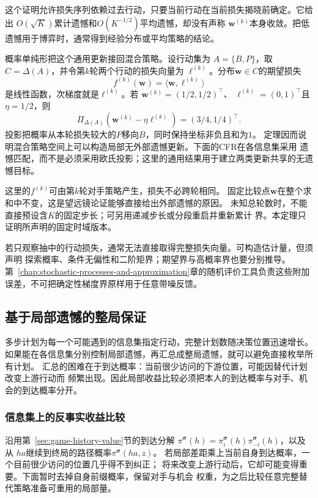 这个证明允许损失序列依赖过去行动，只要当前行动在当前损失揭晓前确定。它给出
\(O(\sqrt{K})\)累计遗憾和\(O(K^{-1/2})\)平均遗憾，却没有声称
\(\bm{w}^{(k)}\)本身收敛。把低遗憾用于博弈时，通常得到经验分布或平均策略的结论。

概率单纯形把这个通用更新接回混合策略。设行动集为
\(A=\{B,P\}\)，取\(C=\Delta(A)\)，并令第\(k\)轮两个行动的损失向量为
\(\bm{\ell}^{(k)}\)。分布\(\bm{w}\in C\)的期望损失
\[
  f^{(k)}(\bm{w})
  =
  \langle\bm{w},\bm{\ell}^{(k)}\rangle
\]
是线性函数，次梯度就是\(\bm{\ell}^{(k)}\)。若
\(\bm{w}^{(k)}=(1/2,1/2)^{\top}\)、
\(\bm{\ell}^{(k)}=(0,1)^{\top}\)且\(\eta=1/2\)，则
\[
  \Pi_{\Delta(A)}
  \left(
    \bm{w}^{(k)}-\eta\bm{\ell}^{(k)}
  \right)
  =
  (3/4,1/4)^{\top}.
\]
投影把概率从本轮损失较大的\(P\)移向\(B\)，同时保持坐标非负且和为\(1\)。
定理因而说明混合策略空间上可以构造局部无外部遗憾更新。下面的CFR在各信息集采用
遗憾匹配，而不是必须采用欧氏投影；这里的通用结果用于建立两类更新共享的无遗憾目标。

这里的\(f^{(k)}\)可由第\(k\)轮对手策略产生，损失不必跨轮相同。
固定比较点\(\bm w\)在整个求和中不变，这是望远镜论证能够直接给出外部遗憾的原因。
未知总轮数时，不能直接预设含\(K\)的固定步长；可另用递减步长或分段重启并重新累计
界。本定理只证明所声明的固定时域版本。

若只观察抽中的行动损失，通常无法直接取得完整损失向量。可构造估计量，但须声明
探索概率、条件无偏性和二阶矩界；期望界与高概率界也要分别推导。
第~\ref{chap:stochastic-processes-and-approximation}章的随机评价工具负责这些附加
误差，不可把确定性梯度界原样用于任意带噪反馈。

\subsection{基于局部遗憾的整局保证}
\label{sec:game-local-to-global-regret}

多步计划为每一个可能遇到的信息集指定行动，完整计划数随决策位置迅速增长。
如果能在各信息集分别控制局部遗憾，再汇总成整局遗憾，就可以避免直接枚举所有计划。
汇总的困难在于到达概率：当前很少访问的下游位置，可能因替代计划改变上游行动而
频繁出现。因此局部收益比较必须把本人的到达概率与对手、机会的到达概率分开。

\subsubsection{信息集上的反事实收益比较}
\label{sec:game-counterfactual-comparison}

沿用第~\ref{sec:game-history-value}节的到达分解
\(\pi^{\bm\sigma}(h)=\pi_i^{\bm\sigma}(h)\pi_{-i}^{\bm\sigma}(h)\)，以及从
\(ha\)继续到终局的路径概率\(\pi^{\bm\sigma}(ha,z)\)。
若局部差距乘上当前自身到达概率，一个目前很少访问的位置几乎得不到纠正；
将来改变上游行动后，它却可能变得重要。下面暂时去掉自身前缀概率，保留对手与机会
权重，为之后比较任意完整替代策略准备可重用的局部量。

